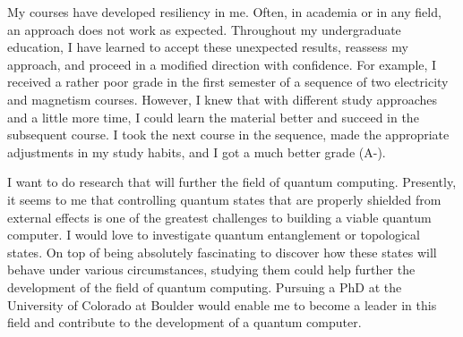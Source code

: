 {    My courses have developed resiliency in me. Often, in academia or in any
    field, an approach does not work as expected. Throughout my undergraduate
    education, I have learned to accept these unexpected results, reassess my
    approach, and proceed in a modified direction with confidence.  For
    example, I received a rather poor grade in the first semester of a sequence
    of two electricity and magnetism courses. However, I knew that with
    different study approaches and a little more time, I could learn the
    material better and succeed in the subsequent course. I took the next
    course in the sequence, made the appropriate adjustments in my study
    habits, and I got a much better grade (A-).

    I want to do research that will further the field of quantum computing.
    Presently, it seems to me that controlling quantum states that are properly
    shielded from external effects is one of the greatest challenges to
    building a viable quantum computer.  I would love to investigate quantum
    entanglement or topological states.  On top of being absolutely fascinating
    to discover how these states will behave under various circumstances,
    studying them could help further the development of the field of quantum
    computing.  Pursuing a PhD at the University of Colorado at Boulder would
    enable me to become a leader in this field and contribute to the
    development of a quantum computer.}



